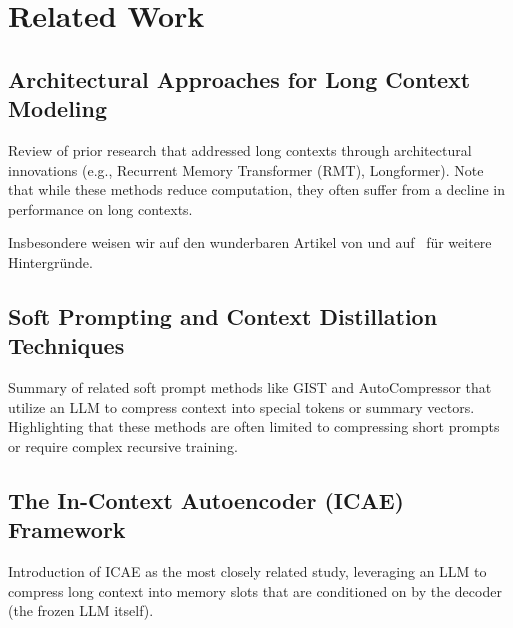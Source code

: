 \chapter{Related Work}


\section{Architectural Approaches for Long Context Modeling}

Review of prior research that addressed long contexts through architectural innovations (e.g., Recurrent Memory Transformer (RMT), Longformer). Note that while these methods reduce computation, they often suffer from a decline in performance on long contexts.

Insbesondere weisen wir auf den wunderbaren Artikel von \textcite{Edmonds:1965} und auf~\cite{GareyJohnson:1979} für weitere Hintergründe.


\section{Soft Prompting and Context Distillation Techniques}

Summary of related soft prompt methods like GIST and AutoCompressor that utilize an LLM to compress context into special tokens or summary vectors. Highlighting that these methods are often limited to compressing short prompts or require complex recursive training.


\section{The In-Context Autoencoder (ICAE) Framework}

Introduction of ICAE as the most closely related study, leveraging an LLM to compress long context into memory slots that are conditioned on by the decoder (the frozen LLM itself).
